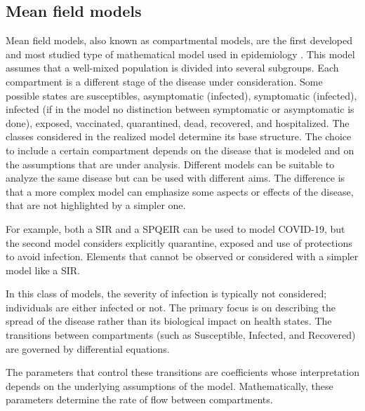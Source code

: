 \subsection{Mean field models}
\label{subsec:mean_field}
 Mean field models, also known as compartmental models, are the first developed and most studied type of mathematical model used in epidemiology \cite{kermack1927, brauer2012mathematical, Anderson_82, anderson1991infectious}.  This model assumes that a well-mixed population is divided into several subgroups. Each compartment is a different stage of the disease under consideration. Some possible states are susceptibles, asymptomatic (infected), symptomatic (infected), infected (if in the model no distinction between symptomatic or asymptomatic is done), exposed, vaccinated, quarantined, dead, recovered, and hospitalized. The classes considered in the realized model determine its base structure. The choice to include a certain compartment depends on the disease that is modeled and on the assumptions that are under analysis. Different models can be suitable to analyze the same disease but can be used with different aims. The difference is that a more complex model can emphasize some aspects or effects of the disease, that are not highlighted by a simpler one.
 
For example, both a SIR \cite{Dehning_2020} and a SPQEIR \cite{Proverbio_2021} can be used to model COVID-19, but the second model considers explicitly quarantine, exposed and use of protections to avoid infection. Elements that cannot be observed or considered with a simpler model like a SIR.
  
In this class of models, the severity of infection is typically not considered; individuals are either infected or not. The primary focus is on describing the spread of the disease rather than its biological impact on health states. The transitions between compartments (such as Susceptible, Infected, and Recovered) are governed by differential equations.

The parameters that control these transitions are coefficients whose interpretation depends on the underlying assumptions of the model. Mathematically, these parameters determine the rate of flow between compartments.

